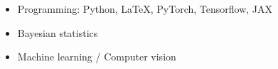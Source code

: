 \begin{itemize}[leftmargin=*]
  \itemsep-0.5em 
  \item Programming: Python, LaTeX, PyTorch, Tensorflow, JAX
  \item Bayesian statistics
  \item Machine learning / Computer vision
\end{itemize}
